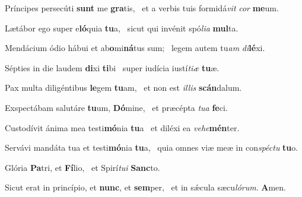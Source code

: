 \item Príncipes persecúti \textbf{sunt} me \textbf{gra}tis,~\psstar{} et a verbis tuis formidá\textit{vit} \textit{cor} \textbf{me}um.

\item Lætábor ego super e\textbf{ló}quia \textbf{tu}a,~\psstar{} sicut qui invénit spó\textit{lia} \textbf{mul}ta.

\item Mendácium ódio hábui et ab\textbf{o}mi\textbf{ná}tus sum;~\psstar{} legem autem tu\textit{am} \textit{di}\textbf{lé}xi.

\item Sépties in die laudem \textbf{di}xi \textbf{ti}bi~\psstar{} super iudícia iustí\textit{tiæ} \textbf{tu}æ.

\item Pax multa diligéntibus \textbf{le}gem \textbf{tu}am,~\psstar{} et non est \textit{illis} \textbf{scán}dalum.

\item Exspectábam salutáre \textbf{tu}um, \textbf{Dó}mine,~\psstar{} et præcépta \textit{tua} \textbf{fe}ci.

\item Custodívit ánima mea testi\textbf{mó}nia \textbf{tu}a~\psstar{} et diléxi ea \textit{vehe}\textbf{mén}ter.

\item Servávi mandáta tua et testi\textbf{mó}nia \textbf{tu}a,~\psstar{} quia omnes viæ meæ in con\textit{spéctu} \textbf{tu}o.

\item Glória \textbf{Pa}tri, et \textbf{Fí}lio,~\psstar{} et Spirí\textit{tui} \textbf{Sanc}to.

\item Sicut erat in princípio, et \textbf{nunc}, et \textbf{sem}per,~\psstar{} et in sǽcula sæcu\textit{lórum}. \textbf{A}men.
